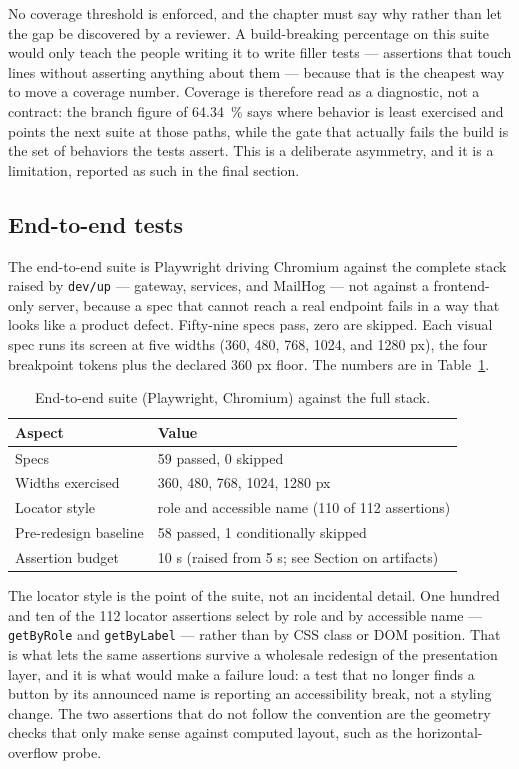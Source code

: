 No coverage threshold is enforced, and the chapter must say why rather than let the gap be
discovered by a reviewer. A build-breaking percentage on this suite would only teach the people
writing it to write filler tests — assertions that touch lines without asserting anything about
them — because that is the cheapest way to move a coverage number. Coverage is therefore read as a
diagnostic, not a contract: the branch figure of 64.34~\% says where behavior is least exercised and
points the next suite at those paths, while the gate that actually fails the build is the set of
behaviors the tests assert. This is a deliberate asymmetry, and it is a limitation, reported as such
in the final section.

\subsection{End-to-end tests}

The end-to-end suite is Playwright driving Chromium against the complete stack raised by
\texttt{dev/up} — gateway, services, and MailHog — not against a frontend-only server, because a
spec that cannot reach a real endpoint fails in a way that looks like a product defect. Fifty-nine
specs pass, zero are skipped. Each visual spec runs its screen at five widths (360, 480, 768, 1024,
and 1280 px), the four breakpoint tokens plus the declared 360 px floor. The numbers are in
Table~\ref{tab:e2e}.

\begin{table}[htbp]
  \centering
  \begin{tabular}{ll}
    \hline
    Aspect & Value \\
    \hline
    Specs & 59 passed, 0 skipped \\
    Widths exercised & 360, 480, 768, 1024, 1280 px \\
    Locator style & role and accessible name (110 of 112 assertions) \\
    Pre-redesign baseline & 58 passed, 1 conditionally skipped \\
    Assertion budget & 10 s (raised from 5 s; see Section on artifacts) \\
    \hline
  \end{tabular}
  \caption{End-to-end suite (Playwright, Chromium) against the full stack.}
  \label{tab:e2e}
\end{table}

The locator style is the point of the suite, not an incidental detail. One hundred and ten of the
112 locator assertions select by role and by accessible name — \verb|getByRole| and
\verb|getByLabel| — rather than by CSS class or DOM position. That is what lets the same assertions
survive a wholesale redesign of the presentation layer, and it is what would make a failure loud:
a test that no longer finds a button by its announced name is reporting an accessibility break, not
a styling change. The two assertions that do not follow the convention are the geometry checks that
only make sense against computed layout, such as the horizontal-overflow probe.

